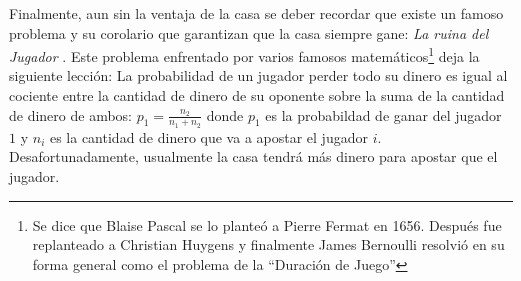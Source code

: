 \begin{table}[ht]
\centering
{}
\caption{Ventajas de la casa para juegos populares de casino \cite{hannum2005practical}}
\label{ventaja-casa}
\end{table}

Finalmente, aun sin la ventaja de la casa se deber recordar que existe un famoso problema y su corolario que garantizan que la casa siempre gane: \emph{La ruina del Jugador} \cite[p.~95-99]{ross2006first}. Este problema enfrentado por varios famosos matemáticos\footnote{Se dice que Blaise Pascal se lo planteó a Pierre Fermat en 1656. Después fue replanteado a Christian Huygens y finalmente James Bernoulli resolvió en su forma general como el problema de la ``Duración de Juego''} deja la siguiente lección: La probabilidad de un jugador perder todo su dinero es igual al cociente entre la cantidad de dinero de su oponente sobre la suma de la cantidad de dinero de ambos: $p_1 = \frac{n_2}{n_1 + n_2}$ donde $p_1$ es la probabildad de ganar del jugador $1$ y $n_i$ es la cantidad de dinero que va a apostar el jugador $i$. Desafortunadamente, usualmente  la casa tendrá más dinero para apostar que el jugador.


